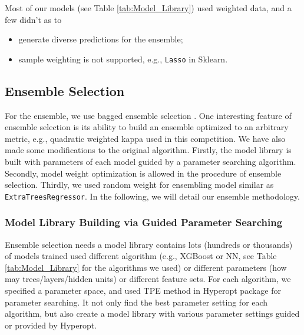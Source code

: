 \documentclass[12pt]{article}
\begin{document}
Most of our models (see Table \ref{tab:Model_Library}) used weighted data, and a few didn't as to
\begin{itemize}
\item generate diverse predictions for the ensemble;
\item sample weighting is not supported, e.g., \texttt{Lasso} in Sklearn.
\end{itemize}

\subsection{Ensemble Selection}
For the ensemble, we use bagged ensemble selection \cite{ensemble_selection}. One interesting feature of ensemble selection is its ability to build an ensemble optimized to an arbitrary metric, e.g., quadratic weighted kappa used in this competition. We have also made some modifications to the original algorithm. Firstly, the model library is built with parameters of each model guided by a parameter searching algorithm. Secondly, model weight optimization is allowed in the procedure of ensemble selection. Thirdly, we used random weight for ensembling model similar as \texttt{ExtraTreesRegressor}. In the following, we will detail our ensemble methodology.

\subsubsection{Model Library Building via Guided Parameter Searching}
Ensemble selection needs a model library contains lots (hundreds or thousands) of models trained used different algorithm (e.g., XGBoost or NN, see Table \ref{tab:Model_Library} for the algorithms we used) or different parameters (how may trees/layers/hidden units) or different feature sets. For each algorithm, we specified a parameter space, and used TPE method \cite{hyperopt} in Hyperopt package \cite{hyperopt_url} for parameter searching. It not only find the best parameter setting for each algorithm, but also create a model library with various parameter settings guided or provided by Hyperopt.
\end{document}
